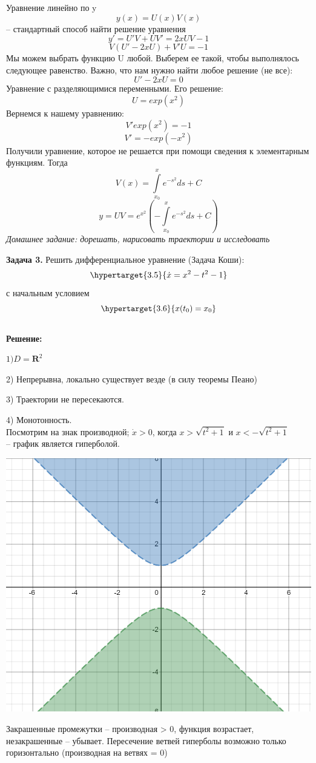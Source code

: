 \documentclass[10pt]{report}
\begin{document}
Уравнение линейно по y\[
y(x) = U(x)V(x)\] -- стандартный способ найти решение уравнения
\[
y' = U'V+UV' = 2xUV -1 \]
\[
V(U'-2xU)+V'U = -1\]
Мы можем выбрать функцию U любой. Выберем ее такой, чтобы выполнялось следующее равенство. Важно, что нам нужно найти любое решение (не все):
\[ U'-2xU = 0\]
Уравнение с разделяющимися переменными. Его решение:
\[U = exp(x^2)\]
Вернемся к нашему уравнению:
\[
V'exp(x^2) = -1\]
\[ V' = -exp(-x^2)\]
Получили уравнение, которое не решается при помощи сведения к элементарным функциям. Тогда
\[
V (x) = \int\limits_{x_0}^x e^{-s^2} ds + C
\]\[
y = UV = e^{x^2}\left(- \int\limits_{x_0}^x  e^{-s^2} ds + C \right) \]
\textit{Домашнее задание: дорешать, нарисовать траектории и исследовать}

\vspace{15mm}
 \textbf{Задача 3.} Решить дифференциальное уравнение (Задача Коши): 
\newline
\begin{equation}
\hypertarget{3.5}{\dot{x} =x^2 - t^2-1}
\end{equation}
\newline
с начальным условием
\newline
\begin{equation}
\hypertarget{3.6}{x(t_0) = x_0}
\end{equation}\\
\textbf {Решение:}

$1) D= \textbf{R}^2 $

2) Непрерывна, локально существует везде (в силу теоремы Пеано)

3) Траектории не пересекаются.

4) Монотонность.\\
Посмотрим на знак производной;
$\dot{x} > 0$, когда $x > \sqrt{t^2+1}$ и $x <- \sqrt{t^2+1} $\\ -- график является гиперболой. 
\begin{center}
{\includegraphics[scale=0.45]{graph3.4.png}} 
\end{center}
Закрашенные промежутки -- производная > 0, функция возрастает, незакрашенные -- убывает. Пересечение ветвей гиперболы возможно только горизонтально (производная на ветвях = 0)
\end{document}
